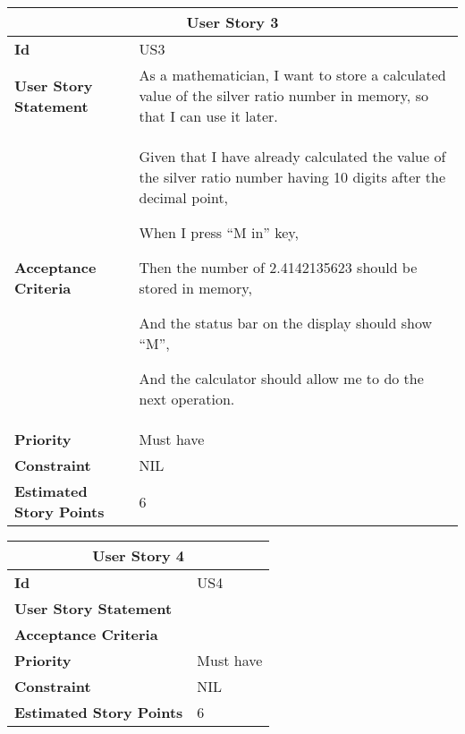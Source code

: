 \hspace{1cm}
\begin{center}
\begin{tabular}{ | m{2cm} | m{12cm} | } 

 \hline
 \multicolumn{2}{|c|}{\textbf{User Story 3}} \\

\hline
\textbf{Id} & US3 \\ 

\hline
\textbf{User Story Statement} &  As a mathematician, I want to store a calculated value of the silver ratio number in memory, so that I can use it later.\\ 

\hline
\textbf{Acceptance Criteria} & Given that I have already calculated the value of the silver ratio number having 10 digits after the decimal point,

When I press ``M in'' key,

Then the number of 2.4142135623 should be stored in memory,

And the status bar on the display should show ``M'',

And the calculator should allow me to do the next operation.\\ 

\hline
\textbf{Priority} & Must have \\ 

\hline
\textbf{Constraint} & NIL\\ 

\hline
\textbf{Estimated Story Points} & 6 \\ 
\hline

\end{tabular}
\end{center}

\hspace{1cm}
\begin{center}
\begin{tabular}{ | m{2cm} | m{12cm} | } 

 \hline
 \multicolumn{2}{|c|}{\textbf{User Story 4}} \\

\hline
\textbf{Id} & US4 \\ 

\hline
\textbf{User Story Statement} & \\ 

\hline
\textbf{Acceptance Criteria} & \\ 

\hline
\textbf{Priority} & Must have \\ 

\hline
\textbf{Constraint} & NIL\\ 

\hline
\textbf{Estimated Story Points} & 6 \\ 
\hline

\end{tabular}
\end{center}

